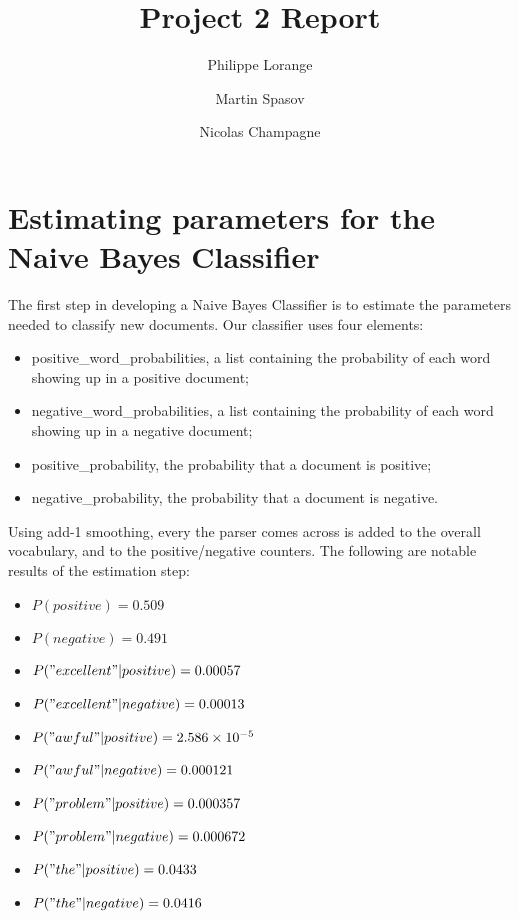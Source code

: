 \documentclass[]{llncs}
\begin{document}
%
\title{Project 2 Report}
%
%
\author{Philippe Lorange \and
Martin Spasov \and
Nicolas Champagne}

%
\maketitle              %
%

\section{Estimating parameters for the Naive Bayes Classifier}
The first step in developing a Naive Bayes Classifier is to estimate the parameters needed to classify new documents. Our classifier uses four elements:
\begin{itemize}
	\item positive\_word\_probabilities, a list containing the probability of each word showing up in a positive document;
	\item negative\_word\_probabilities, a list containing the probability of each word showing up in a negative document;
	\item positive\_probability, the probability that a document is positive;
	\item negative\_probability, the probability that a document is negative.
\end{itemize}

Using add-1 smoothing, every the parser comes across is added to the overall vocabulary, and to the positive/negative counters. The following are notable results of the estimation step:
\begin{itemize}
	\item $P(positive)= 0.509$
	\item $P(negative)= 0.491$\\
	\item $P("excellent"|positive)= 0.00057$
	\item $P("excellent"|negative)= 0.00013$ \\
	\item $P("awful"|positive)= 2.586\times10^{-5}$
	\item $P("awful"|negative)= 0.000121$\\
	\item $P("problem"|positive)=0.000357$
	\item $P("problem"|negative)=0.000672$\\
	\item $P("the"|positive)=0.0433$
	\item $P("the"|negative)=0.0416$
\end{itemize}
\end{document}
